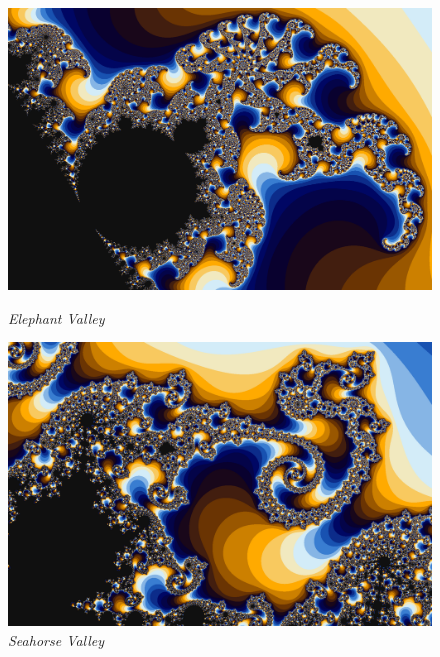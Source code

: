 \documentclass[final,12pt,a4paper]{elsarticle}
\begin{document}
\begin{figure}[htpb]
    \captionsetup{width=.4\linewidth}
    \centering
    \begin{minipage}{.48\textwidth}
    \centering
        \includegraphics[width=.95\textwidth]{elephant}
    \caption{\textit{Elephant Valley}}
    \label{fig:regions}
    \end{minipage}%
    \begin{minipage}{.48\textwidth}
    \centering
        \includegraphics[width=.95\textwidth]{seahorse}
    \caption{\textit{Seahorse Valley}}
    \label{fig:regions}
    \end{minipage}


\end{figure}
\end{document}

